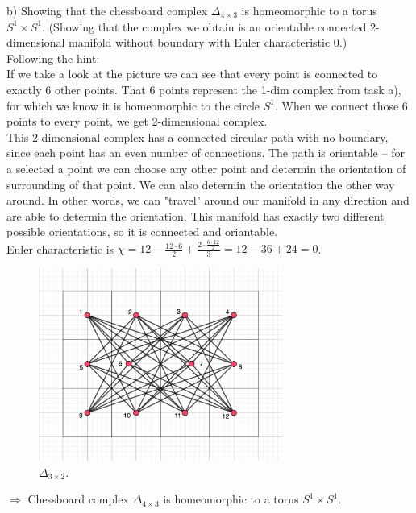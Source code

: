 \documentclass[a4paper,11pt]{article}
\begin{document}

\noindent
b) Showing that the chessboard complex $\Delta_{4 \times 3}$ is homeomorphic to a torus $S^1 \times S^1$. (Showing that the complex we obtain is an orientable connected 2-dimensional manifold without boundary with Euler characteristic 0.)
\\
Following the hint:
\\
If we take a look at the picture we can see that every point is connected to exactly 6 other points. That 6 points represent the 1-dim complex from task a),
for which we know it is homeomorphic to the circle $S^1$. When we connect those 6 points to every point, we get 2-dimensional complex.
\\
This 2-dimensional complex has a connected circular path with no boundary, since each point has an even number of connections.
The path is orientable -- for a selected a point we can choose any other point and determin the orientation of surrounding of that point. We can also determin the orientation the other way around. In other words, we can "travel" around our manifold in any direction and are able to determin the orientation.
This manifold has exactly two different possible orientations, so it is connected and oriantable.
\\
Euler characteristic is $\chi = 12 - \frac{12 \cdot 6}{2} + \frac{2 \cdot \frac{6 \cdot 12}{2}}{3} = 12 - 36 + 24 = 0$.

\begin{figure}[ht!]
    \centering
    \includegraphics[width=80mm]{1_4_b.png}
    \caption{$\Delta_{3 \times 2}$.}
\end{figure}
\noindent
$\Rightarrow$ Chessboard complex $\Delta_{4 \times 3}$ is homeomorphic to a torus $S^1 \times S^1$.
\\

\end{document}
